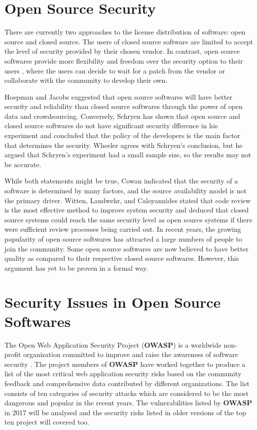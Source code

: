 \documentclass[12pt, a4paper]{report}
\begin{document}
\section{Open Source Security}
There are currently two approaches to the license distribution of software: open source and closed
source. The users of closed source software are limited to accept the level of security
provided by their chosen vendor. In contrast, open source softwares provide more flexibility and
freedom over the security option to their users \cite{payne_2002}, where the users can decide to
wait for a patch from the vendor or collaborate with the community to develop their own.

Hoepman and Jacobs \cite{hoepman_2007} suggested that open source softwares will have better
security and reliability than closed source softwares through the power of open data and
crowdsourcing. Conversely, Schryen \cite{schryen_2011} has shown that open source and closed source
softwares do not have significant security dfference in his experiment and concluded that the policy
of the developers is the main factor that determines the security. Wheeler \cite{wheeler_2015}
agrees with Schryen's conclusion, but he argued that Schryen's experiment had a small sample size,
so the results may not be accurate.

While both statements might be true, Cowan \cite{cowan_2003} indicated that the security of a
software is determined by many factors, and the source availability model is not the primary driver.
Witten, Landwehr, and Caloyannides \cite{witten_2001} stated that code review is the most effective
method to improve system security and deduced that closed source systems could reach the same
security level as open source systems if there were sufficient review processes being carried out.
In recent years, the growing popularity of open source softwares has attracted a large numbers of
people to join the community. Some open source softwares are now believed to have better quality as
compared to their respective closed source softwares. However, this argument has yet to be proven in
a formal way.

\section{Security Issues in Open Source Softwares}
The Open Web Application Security Project (\textbf{OWASP}) is a worldwide non-profit organization
committed to improve and raise the awareness of software security \cite{owasp_home}. The project
members of \textbf{OWASP} have worked together to produce a list of the most critical web
application security risks based on the community feedback and comprehensive data contributed by
different organizations. The list consists of ten categories of security attacks which are
considered to be the most dangerous and popular in the recent years. The vulnerabilities listed by
\textbf{OWASP} in 2017 \cite{owasp_top10} will be analysed and the security risks listed in older
versions of the top ten project will covered too.
\end{document}
